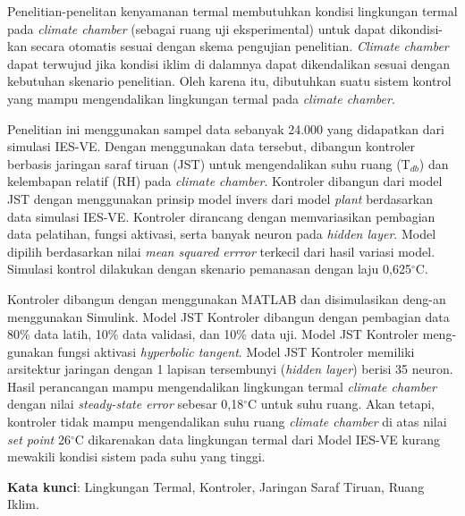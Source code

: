 Penelitian-penelitan kenyamanan termal membutuhkan kondisi lingkungan termal pada \textit{climate chamber} (sebagai ruang uji eksperimental) untuk dapat dikondisi-kan secara otomatis sesuai dengan skema pengujian penelitian. \textit{Climate chamber} dapat terwujud jika kondisi iklim di dalamnya dapat dikendalikan sesuai dengan kebutuhan skenario penelitian. Oleh karena itu, dibutuhkan suatu sistem kontrol yang mampu mengendalikan lingkungan termal pada \textit{climate chamber}.

Penelitian ini menggunakan sampel data sebanyak 24.000 yang didapatkan dari simulasi IES-VE. Dengan menggunakan data tersebut, dibangun kontroler berbasis jaringan saraf tiruan (JST) untuk mengendalikan suhu ruang (T$_{db}$) dan kelembapan relatif (RH) pada \textit{climate chamber}. Kontroler dibangun dari model JST dengan menggunakan prinsip model invers dari model \textit{plant} berdasarkan data simulasi IES-VE. Kontroler dirancang dengan memvariasikan pembagian data pelatihan, fungsi aktivasi, serta banyak neuron pada \textit{hidden layer}. Model dipilih berdasarkan nilai \textit{mean squared errror} terkecil dari hasil variasi model. Simulasi kontrol dilakukan dengan skenario pemanasan dengan laju 0,625$^\circ$C. %

Kontroler dibangun dengan menggunakan MATLAB dan disimulasikan deng-an menggunakan Simulink. Model JST Kontroler dibangun dengan pembagian data 80\% data latih, 10\% data validasi, dan 10\% data uji. Model JST Kontroler meng-gunakan fungsi aktivasi \textit{hyperbolic tangent}. Model JST Kontroler memiliki arsitektur jaringan dengan 1 lapisan tersembunyi (\textit{hidden layer}) berisi 35 neuron. Hasil perancangan mampu mengendalikan lingkungan termal \textit{climate chamber} dengan nilai \textit{steady-state error} sebesar 0,18$^\circ$C untuk suhu ruang. Akan tetapi, kontroler tidak mampu mengendalikan suhu ruang \textit{climate chamber} di atas nilai \textit{set point} 26$^\circ$C dikarenakan data lingkungan termal dari Model IES-VE kurang mewakili kondisi sistem pada suhu yang tinggi.

\vspace{0.4cm}
\hspace{-1.2cm}
\textbf{Kata kunci}: Lingkungan Termal, Kontroler, Jaringan Saraf Tiruan, Ruang Iklim.

